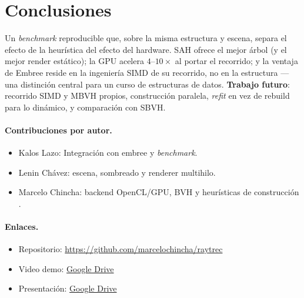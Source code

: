 \documentclass[10pt]{article}
\begin{document}
\section{Conclusiones}
Un \emph{benchmark} reproducible que, sobre la misma estructura y escena, separa
el efecto de la heurística del efecto del hardware. SAH ofrece el mejor árbol (y
el mejor render estático); la GPU acelera $4$--$10\times$ al portar el recorrido;
y la ventaja de Embree reside en la ingeniería SIMD de su recorrido, no en la
estructura ---una distinción central para un curso de estructuras de datos.
\textbf{Trabajo futuro}: recorrido SIMD y MBVH propios, construcción paralela,
\emph{refit} en vez de rebuild para lo dinámico, y comparación con SBVH.

\paragraph{Contribuciones por autor.} 
\begin{itemize}\setlength{\itemsep}{0pt}\setlength{\parskip}{0pt}\setlength{\topsep}{2pt}
  \item Kalos Lazo: Integración con embree y \emph{benchmark}.
  \item Lenin Chávez: escena, sombreado y renderer multihilo.
  \item Marcelo Chincha: backend OpenCL/GPU, BVH y heurísticas de construcción .
\end{itemize}

\paragraph{Enlaces.}
\begin{itemize}\setlength{\itemsep}{0pt}\setlength{\parskip}{0pt}\setlength{\topsep}{2pt}
  \item Repositorio: \url{https://github.com/marcelochincha/raytrec}
  \item Video demo: \href{https://drive.google.com/file/d/1uqEXMXC3iAAqOnv-YAQSjdeJ0dVSi4E4/view?usp=sharing}{Google Drive}
  \item Presentación: \href{https://drive.google.com/file/d/1Rf2MCSFvWEqkr26nSV0A_HS66tds9DNl/view?usp=sharing}{Google Drive}
\end{itemize}
\end{document}
